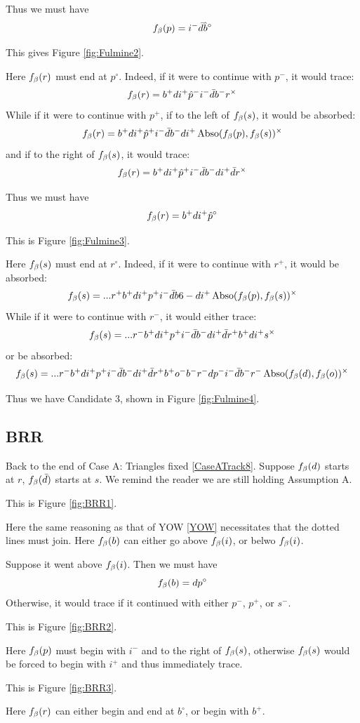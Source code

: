 Thus we must have
\[
f_\beta(p) = i^- \bar{d} \hat{b}^\circ
\]

This gives Figure \ref{fig:Fulmine2}.

Here $f_\beta(r)$ must end at $p^\circ$. Indeed, if it were to continue with $p^-$, it would trace:
\[
f_\beta(r) = b^+ d i^+ \hat{p}^- i^- \bar{d} b^- r^\times
\]
While if it were to continue with $p^+$, if to the left of $f_\beta(s)$, it would be absorbed:
\[
f_\beta(r) = b^+ d i^+ \hat{p}^+ i^- \bar{d} b^- d i^+ \operatorname{Abso}(f_\beta(p), f_\beta(s))^\times
\]
and if to the right of $f_\beta(s)$, it would trace:
\[
f_\beta(r) = b^+ d i^+ \hat{p}^+ i^- \bar{d} b^- d i^+ \bar{d} r^\times
\]

Thus we must have
\[
f_\beta(r) = b^+ d i^+ \hat{p}^\circ
\]

This is Figure \ref{fig:Fulmine3}.

Here $f_\beta(s)$ must end at $r^\circ$. Indeed, if it were to continue with $r^+$, it would be absorbed:
\[
f_\beta(s) =...r^+ b^+ d i^+ p^+ i^- \bar{d} b6- d i^+ \operatorname{Abso}(f_\beta(p), f_\beta(s))^\times
\]
While if it were to continue with $r^-$, it would either trace:
\[
f_\beta(s) =...r^- b^+ d i^+ p^+ i^- \bar{d} b^- d i^+ \bar{d} r^+ b^+ d i^+ s^\times 
\]
or be absorbed:
\[
f_\beta(s) =...r^- b^+ d i^+ p^+ i^- \bar{d} b^- d i^+ \bar{d} r^+ b^+ o^- b^- r^- d p^- i^- \bar{d} b^- r^- \operatorname{Abso}(f_\beta(d), f_\beta(o))^\times
\]

Thus we have Candidate 3, shown in Figure \ref{fig:Fulmine4}.

\subsection{BRR}\label{BRR}
Back to the end of Case A: Triangles fixed \ref{CaseATrack8}. Suppose $f_\beta(d)$ starts at $r$, $f_\beta(\bar{d})$ starts at $s$. We remind the reader we are still holding Assumption A. 

This is Figure \ref{fig:BRR1}.

Here the same reasoning as that of YOW \ref{YOW} necessitates that the dotted lines must join. Here $f_\beta(b)$ can either go above $f_\beta(i)$, or belwo $f_\beta(i)$.

Suppose it went above $f_\beta(i)$. Then we must have
\[
f_\beta(b) = d p^\circ
\]
Otherwise, it would trace if it continued with either $p^-$, $p^+$, or $s^-$. 

This is Figure \ref{fig:BRR2}.

Here $f_\beta(p)$ must begin with $i^-$ and to the right of $f_\beta(s)$, otherwise $f_\beta(s)$ would be forced to begin with $i^+$ and thus immediately trace.

This is Figure \ref{fig:BRR3}.

Here $f_\beta(r)$ can either begin and end at $b^\circ$, or begin with $b^+$.


